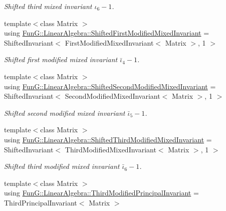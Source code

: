 \begin{DoxyCompactItemize}
\begin{DoxyCompactList}\small\item\em Shifted third mixed invariant $ \iota_6 - 1 $. \end{DoxyCompactList}\item 
\hypertarget{group__InvariantGroup_gaf8a055957b9e085efb2852a37523c8f1}{{\footnotesize template$<$class Matrix $>$ }\\using \hyperlink{group__InvariantGroup_gaf8a055957b9e085efb2852a37523c8f1}{Fun\-G\-::\-Linear\-Algebra\-::\-Shifted\-First\-Modified\-Mixed\-Invariant} = Shifted\-Invariant$<$ First\-Modified\-Mixed\-Invariant$<$ Matrix $>$, 1 $>$}\label{group__InvariantGroup_gaf8a055957b9e085efb2852a37523c8f1}

\begin{DoxyCompactList}\small\item\em Shifted first modified mixed invariant $ \bar\iota_4 - 1 $. \end{DoxyCompactList}\item 
\hypertarget{group__InvariantGroup_ga13de3bdcfd66e64872e3e488fa37be97}{{\footnotesize template$<$class Matrix $>$ }\\using \hyperlink{group__InvariantGroup_ga13de3bdcfd66e64872e3e488fa37be97}{Fun\-G\-::\-Linear\-Algebra\-::\-Shifted\-Second\-Modified\-Mixed\-Invariant} = Shifted\-Invariant$<$ Second\-Modified\-Mixed\-Invariant$<$ Matrix $>$, 1 $>$}\label{group__InvariantGroup_ga13de3bdcfd66e64872e3e488fa37be97}

\begin{DoxyCompactList}\small\item\em Shifted second modified mixed invariant $ \bar\iota_5 - 1 $. \end{DoxyCompactList}\item 
\hypertarget{group__InvariantGroup_ga98671c6cce87a2ef1e90fc5effe21b48}{{\footnotesize template$<$class Matrix $>$ }\\using \hyperlink{group__InvariantGroup_ga98671c6cce87a2ef1e90fc5effe21b48}{Fun\-G\-::\-Linear\-Algebra\-::\-Shifted\-Third\-Modified\-Mixed\-Invariant} = Shifted\-Invariant$<$ Third\-Modified\-Mixed\-Invariant$<$ Matrix $>$, 1 $>$}\label{group__InvariantGroup_ga98671c6cce87a2ef1e90fc5effe21b48}

\begin{DoxyCompactList}\small\item\em Shifted third modified mixed invariant $ \bar\iota_6 - 1 $. \end{DoxyCompactList}\item 
\hypertarget{group__InvariantGroup_gadc1e00e4f5a11502960fe007c0f905d8}{{\footnotesize template$<$class Matrix $>$ }\\using \hyperlink{group__InvariantGroup_gadc1e00e4f5a11502960fe007c0f905d8}{Fun\-G\-::\-Linear\-Algebra\-::\-Third\-Modified\-Principal\-Invariant} = Third\-Principal\-Invariant$<$ Matrix $>$}\label{group__InvariantGroup_gadc1e00e4f5a11502960fe007c0f905d8}


\end{DoxyCompactItemize}
